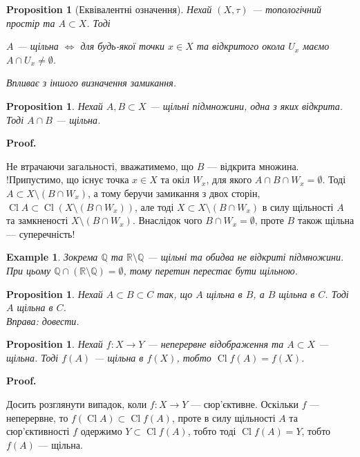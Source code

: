 \documentclass[a4paper, 10pt]{article}
\makeatletter
\theoremstyle{theoremdd}
\newtheorem{example}[theorem]{Example}
\newtheorem{proposition}[theorem]{Proposition}
\DeclareMathOperator{\Cl}{Cl}
\renewenvironment{proof}[1][Proof.\\]{\par
\pushQED{\hfill \qed}%
\normalfont \topsep6\p@\@plus6\p@\relax
\trivlist
\item\relax
{\bfseries
#1\@addpunct{.}}\hspace\labelsep\ignorespaces
}{%
\popQED\endtrivlist\@endpefalse
}
\makeatother
\begin{document}
\begin{proposition}[Еквівалентні означення]
Нехай $(X,\tau)$ --- топологічний простір та $A \subset X$. Тоді
\begin{center}
$A$ --- щільна $\iff$ для будь-якої точки $x \in X$ та відкритого окола $U_x$ маємо $A \cap U_x \neq \emptyset$.
\end{center}
\textit{Впливає з іншого визначення замикання}.
\end{proposition}

\begin{proposition}
Нехай $A,B \subset X$ --- щільні підмножини, одна з яких відкрита. Тоді $A \cap B$ --- щільна.
\end{proposition}

\begin{proof}
Не втрачаючи загальності, вважатимемо, що $B$ --- відкрита множина.\\
!Припустимо, що існує точка $x \in X$ та окіл $W_x$, для якого $A \cap B \cap W_x = \emptyset$. Тоді $A \subset X \setminus (B \cap W_x)$, а тому беручи замикання з двох сторін, $\Cl A \subset \Cl (X \setminus (B \cap W_x))$, але тоді $X \subset X \setminus (B \cap W_x)$ в силу щільності $A$ та замкненості $X \setminus (B \cap W_x)$. Внаслідок чого $B \cap W_x = \emptyset$, проте $B$ також щільна --- суперечність!
\end{proof}

\begin{example}
Зокрема $\mathbb{Q}$ та $\mathbb{R} \setminus \mathbb{Q}$ --- щільні та обидва не відкриті підмножини. При цьому $\mathbb{Q} \cap (\mathbb{R} \setminus \mathbb{Q}) = \emptyset$, тому перетин перестає бути щільною.
\end{example}

\begin{proposition}
Нехай $A \subset B \subset C$ так, що $A$ щільна в $B$, а $B$ щільна в $C$. Тоді $A$ щільна в $C$.\\
\textit{Вправа: довести}.
\end{proposition}

\begin{proposition}
Нехай $f \colon X \to Y$ --- неперервне відображення та $A \subset X$ --- щільна. Тоді $f(A)$ --- щільна в $f(X)$, тобто $\Cl f(A) = f(X)$.
\end{proposition}

\begin{proof}
Досить розглянути випадок, коли $f \colon X \to Y$ --- сюр'єктивне. Оскільки $f$ --- неперервне, то $f (\Cl A) \subset \Cl f(A)$, проте в силу щільності $A$ та сюр'єктивності $f$ одержимо $Y \subset \Cl f(A)$, тобто тоді $\Cl f(A) = Y$, тобто $f(A)$ --- щільна.
\end{proof}
\end{document}
